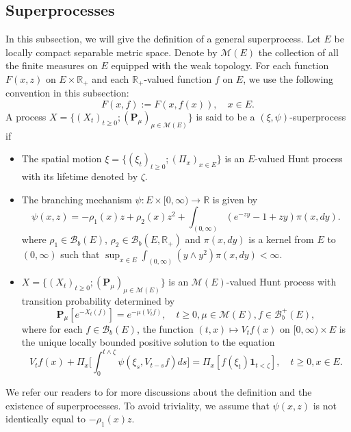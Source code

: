 \documentclass[12pt,a4paper]{amsart}
\theoremstyle{plain}
\theoremstyle{definition}
\numberwithin{equation}{section}
\begin{document}
\subsection{Superprocesses}
\label{sec: definition of superprocess}
    In this subsection, we will give the definition of a general superprocess.
    Let $E$ be locally compact separable metric space. Denote by $\mathcal M(E)$ the collection of all the finite measures on $E$ equipped with the weak topology.
    For each function $F(x,z)$ on $E\times \mathbb R_+$ and each $\mathbb R_+$-valued function $f$ on $E$, we use the following convention in this subsection:
\[
    F(x,f):= F(x,f(x)),\quad x\in E.
\]
    A process $X=\{(X_t)_{t\geq 0}; (\mathbf P_\mu)_{\mu \in \mathcal M(E)}\}$ is said to be a $(\xi,\psi)$-superprocess if
\begin{itemize}
\item
    The spatial motion $\xi=\{(\xi_t)_{t\geq 0};(\Pi_x)_{x\in E}\}$ is an $E$-valued Hunt process with its lifetime denoted by $\zeta$.
\item
    The branching mechanism $\psi: E\times[0,\infty) \to \mathbb R$ is given by
\begin{equation}
\label{eq: branching mechanism}
    \psi(x,z)=
    -\rho_1(x) z + \rho_2 (x) z^2 + \int_{(0,\infty)} (e^{-zy} - 1 + zy) \pi(x,dy).
\end{equation}
    where $\rho_1 \in \mathcal B_b(E)$, $\rho_2 \in \mathcal B_b(E, \mathbb R_+)$ and $\pi(x,dy)$ is a kernel from $E$ to $(0,\infty)$ such that $\sup_{x\in E} \int_{(0,\infty)} (y\wedge y^2) \pi(x,dy) < \infty$.
\item
    $X=\{(X_t)_{t\geq 0}; (\mathbf P_\mu)_{\mu \in \mathcal M(E)}\}$ is an $\mathcal M(E)$-valued Hunt process with transition probability determined by
\begin{equation}
    \mathbf P_\mu [e^{-X_t(f)}] = e^{-\mu(V_tf)},
    \quad t\geq 0, \mu \in \mathcal M(E), f\in \mathcal B^+_b(E),
\end{equation}
    where for each $f\in \mathcal B_b(E)$, the function $(t,x)\mapsto V_tf(x)$ on $[0,\infty) \times E$ is the unique locally bounded positive solution to the equation
\begin{equation}\label{eq:FKPP_in_definition}
    V_tf(x) + \Pi_x \Big[  \int_0^{t\wedge \zeta} \psi(\xi_s,V_{t-s}f)ds \Big]
    = \Pi_x [ f(\xi_t)\mathbf 1_{t<\zeta} ],
    \quad t \geq 0, x \in E.
\end{equation}
\end{itemize}
    We refer our readers to \cite{Li2011Measure-valued} for more discussions about the definition and the existence of superprocesses.
    To avoid triviality, we assume that
    $\psi(x,z)$ is not identically equal to $-\rho_1(x)z$.
\end{document}
